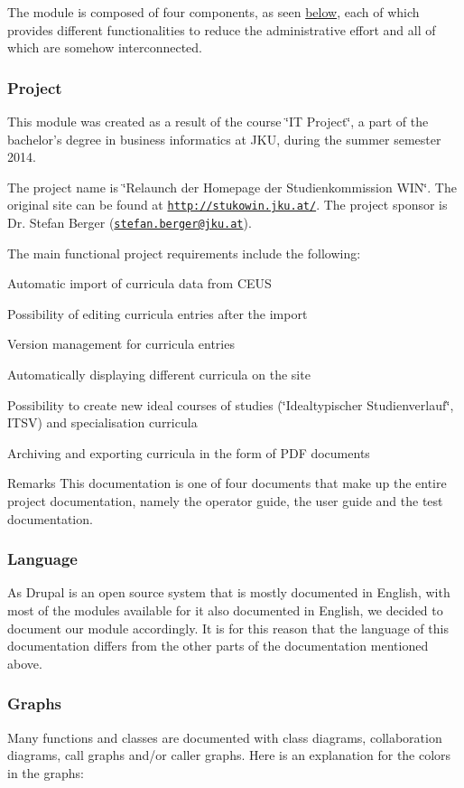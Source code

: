 The module is composed of four components, as seen \hyperlink{index_Modules}{below}, each of which provides different functionalities to reduce the administrative effort and all of which are somehow interconnected.\hypertarget{index_Project_Intro}{}\subsubsection{Project}\label{index_Project_Intro}
This module was created as a result of the course \char`\"{}\+I\+T Project\char`\"{}, a part of the bachelor's degree in business informatics at J\+K\+U, during the summer semester 2014.

The project name is \char`\"{}\+Relaunch der Homepage der Studienkommission W\+I\+N\char`\"{}. The original site can be found at \href{http://stukowin.jku.at/}{\tt http\+://stukowin.\+jku.\+at/}. The project sponsor is Dr. Stefan Berger (\href{mailto:stefan.berger@jku.at}{\tt stefan.\+berger@jku.\+at}).

The main functional project requirements include the following\+:
\begin{DoxyEnumerate}
\item Automatic import of curricula data from C\+E\+U\+S
\item Possibility of editing curricula entries after the import
\item Version management for curricula entries
\item Automatically displaying different curricula on the site
\item Possibility to create new ideal courses of studies (\char`\"{}\+Idealtypischer Studienverlauf\char`\"{}, I\+T\+S\+V) and specialisation curricula
\item Archiving and exporting curricula in the form of P\+D\+F documents
\end{DoxyEnumerate}

\begin{DoxyRemark}{Remarks}
This documentation is one of four documents that make up the entire project documentation, namely the operator guide, the user guide and the test documentation.
\end{DoxyRemark}
\hypertarget{index_Language}{}\subsubsection{Language}\label{index_Language}
As Drupal is an open source system that is mostly documented in English, with most of the modules available for it also documented in English, we decided to document our module accordingly. It is for this reason that the language of this documentation differs from the other parts of the documentation mentioned above.\hypertarget{index_Graphs}{}\subsubsection{Graphs}\label{index_Graphs}
Many functions and classes are documented with class diagrams, collaboration diagrams, call graphs and/or caller graphs. Here is an explanation for the colors in the graphs\+:


